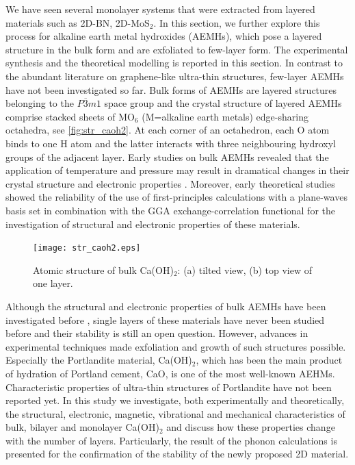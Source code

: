 We have seen several monolayer systems that were extracted from layered materials such as 2D-BN, 2D-MoS$_2$. In this section, we further explore this process for alkaline earth metal hydroxides (AEMHs), which pose a layered structure in the bulk form and are exfoliated to few-layer form. The experimental synthesis and the theoretical modelling is reported in this section. In contrast to the abundant literature on graphene-like ultra-thin structures, few-layer AEMHs have not been investigated so far. Bulk forms of AEMHs are layered structures belonging to the $P\overline{3}m1$ space group\cite{structure1} and the crystal structure of layered AEMHs comprise stacked sheets of MO$_6$ (M=alkaline earth metals) edge-sharing octahedra, see \autoref{fig:str_caoh2}. At each corner of an octahedron, each O atom binds to one H atom and the latter interacts with three neighbouring hydroxyl groups of the adjacent layer. Early studies on bulk AEMHs revealed that the application of temperature and pressure may result in dramatical changes in their crystal structure and electronic properties\cite{amorphization1,amorphization2,amorphization3,amorphization4,transition1,transition2,transition3,transition4} . Moreover, early theoretical studies showed the reliability of the use of first-principles calculations with a plane-waves basis set in combination with the GGA exchange-correlation functional for the investigation of structural and electronic properties of these materials\cite{Winkler1995,Baranek2001,Azuma2011,DArco1993}.

\begin{figure}
\centering
\texttt{[image: str\_caoh2.eps]}
\caption{\label{fig:str_caoh2} Atomic structure of bulk Ca(OH)$_2$: (a)
tilted view, (b) top view of one layer. }
\end{figure}

Although the structural and electronic properties of bulk AEMHs have been
investigated before \cite{Azuma2011,Pishtshev,Pishtshev1} , single layers of 
these materials have never been studied before and their stability is 
still an open question. However, advances 
in experimental techniques made exfoliation and growth of such 
structures possible\cite{new1,new2}. Especially the Portlandite material, Ca(OH)$_2$,
which has been the 
main product of hydration of Portland cement, CaO, is one of the most well-known 
AEHMs. Characteristic properties of ultra-thin structures of Portlandite have 
not been reported yet. In this study we investigate, both experimentally and theoretically, 
the structural, electronic, magnetic, vibrational and mechanical 
characteristics of bulk, bilayer and monolayer Ca(OH)$_{2}$ and discuss how these properties change with the number of layers.  Particularly, the result of the phonon calculations is presented for the confirmation of the stability of the newly proposed 2D material.

